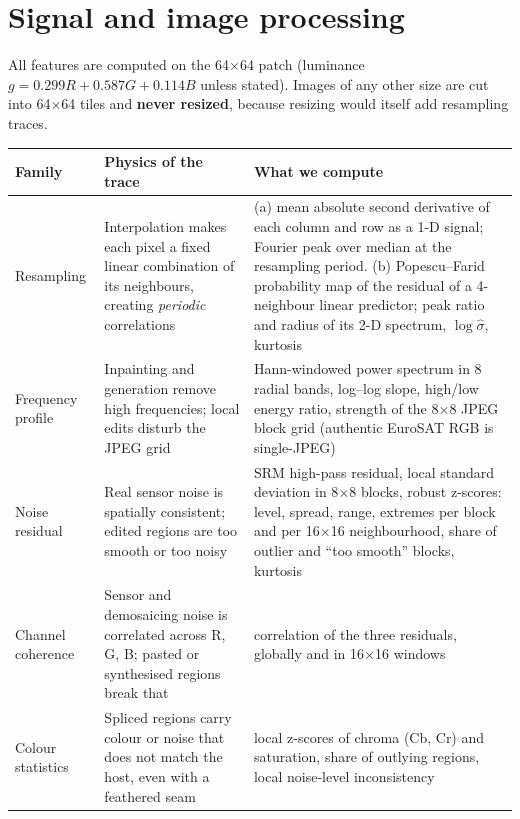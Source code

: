 \section{Signal and image processing}\label{sec:signal}

All features are computed on the 64$\times$64 patch (luminance $g = 0.299R + 0.587G + 0.114B$ unless stated). Images of any other size are cut into 64$\times$64 tiles and \textbf{never resized}, because resizing would itself add resampling traces.

\begin{table}[!htbp]
\centering\small
\begin{tabularx}{\textwidth}{|L{2.4cm}|Y|Y|}
\hline
\textbf{Family} & \textbf{Physics of the trace} & \textbf{What we compute}\\
\hline
Resampling  \cite{popescu} & Interpolation makes each pixel a fixed linear combination of its neighbours, creating \emph{periodic} correlations & (a) mean absolute second derivative of each column and row as a 1-D signal; Fourier peak over median at the resampling period. (b) Popescu--Farid probability map of the residual of a 4-neighbour linear predictor; peak ratio and radius of its 2-D spectrum, $\log\hat\sigma$, kurtosis\\
\hline
Frequency profile  & Inpainting and generation remove high frequencies; local edits disturb the JPEG grid & Hann-windowed power spectrum in 8 radial bands, log--log slope, high/low energy ratio, strength of the 8$\times$8 JPEG block grid (authentic EuroSAT RGB is single-JPEG)\\
\hline
Noise residual  \cite{fridrich2012} & Real sensor noise is spatially consistent; edited regions are too smooth or too noisy & SRM high-pass residual, local standard deviation in 8$\times$8 blocks, robust z-scores: level, spread, range, extremes per block and per 16$\times$16 neighbourhood, share of outlier and ``too smooth'' blocks, kurtosis\\
\hline
Channel coherence  & Sensor and demosaicing noise is correlated across R, G, B; pasted or synthesised regions break that & correlation of the three residuals, globally and in 16$\times$16 windows\\
\hline
Colour statistics  & Spliced regions carry colour or noise that does not match the host, even with a feathered seam & local z-scores of chroma (Cb, Cr) and saturation, share of outlying regions, local noise-level inconsistency\\

\end{tabularx}
\end{table}
